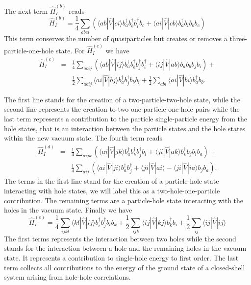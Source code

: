 The next term $\hat{H}_I^{(b)}$  reads
\begin{equation}
	 \hat{H}_I^{(b)} = \frac{1}{4} \sum_{abci}\left(\langle ab|\hat{V}|ci\rangle b_a^\dagger b_b^\dagger b_i^\dagger b_c +\langle ai|\hat{V}|cb\rangle b_a^\dagger b_i b_b b_c\right) \label{eq:2-67b}
\end{equation}
This term conserves the number of quasiparticles but creates or removes a 
three-particle-one-hole  state. 
For $\hat{H}_I^{(c)}$  we have
\begin{align}
	\hat{H}_I^{(c)}& =& \frac{1}{4}
		\sum_{abij}\left(\langle ab|\hat{V}|ij\rangle b_a^\dagger b_b^\dagger b_j^\dagger b_i^\dagger +
		\langle ij|\hat{V}|ab\rangle b_a  b_b b_j b_i \right)+  \nonumber \\
	&&	\frac{1}{2}\sum_{abij}\langle ai|\hat{V}|bj\rangle b_a^\dagger b_j^\dagger b_b b_i + 
		\frac{1}{2}\sum_{abi}\langle ai|\hat{V}|bi\rangle b_a^\dagger b_b. \label{eq:2-68c}
\end{align}

The first line stands for the creation of a two-particle-two-hole state, while the second line represents
the creation to two one-particle-one-hole pairs
while the last term represents a contribution to the particle single-particle energy
from the hole states, that is an interaction between the particle states and the hole states
within the new vacuum  state.
The fourth term reads
\begin{align}
	 \hat{H}_I^{(d)}& = &\frac{1}{4} 
	 	\sum_{aijk}\left(\langle ai|\hat{V}|jk\rangle b_a^\dagger b_k^\dagger b_j^\dagger b_i+
\langle ji|\hat{V}|ak\rangle b_k^\dagger b_j b_i b_a\right)+\nonumber \\
&&\frac{1}{4}\sum_{aij}\left(\langle ai|\hat{V}|ji\rangle b_a^\dagger b_j^\dagger+
\langle ji|\hat{V}|ai\rangle - \langle ji|\hat{V}|ia\rangle b_j b_a \right). \label{eq:2-69d} 
\end{align}
The terms in the first line  stand for the creation of a particle-hole state 
interacting with hole states, we will label this as a two-hole-one-particle contribution. 
The remaining terms are a particle-hole state interacting with the holes in the vacuum state. 
Finally we have 
\begin{equation}
	\hat{H}_I^{(e)} = \frac{1}{4}
		 \sum_{ijkl}
		 \langle kl|\hat{V}|ij\rangle b_i^\dagger b_j^\dagger b_l b_k+
	        \frac{1}{2}\sum_{ijk}\langle ij|\hat{V}|kj\rangle b_k^\dagger b_i
	        +\frac{1}{2}\sum_{ij}\langle ij|\hat{V}|ij\rangle \label{eq:2-70d}
\end{equation}
The first terms represents the 
interaction between two holes while the second stands for the interaction between a hole and the remaining holes in the vacuum state.
It represents a contribution to single-hole energy  to first order.
The last term collects all contributions to the energy of the ground state of a closed-shell system arising
from hole-hole correlations.


